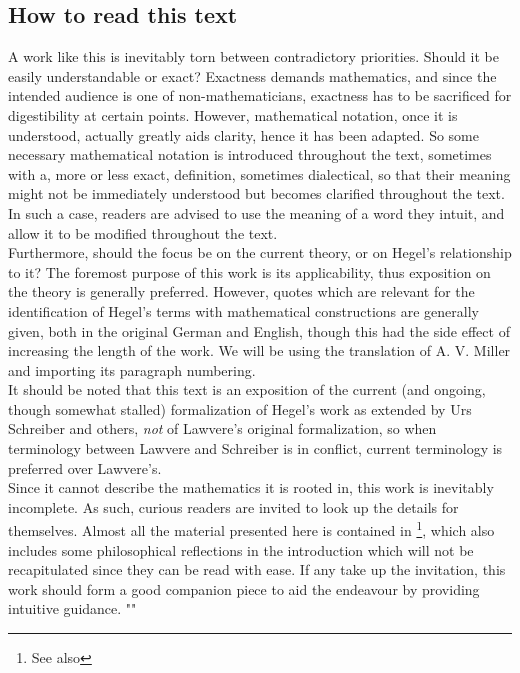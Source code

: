 \documentclass{article}
\begin{document}
\subsection{How to read this text}
A work like this is inevitably torn between contradictory priorities. Should it be easily understandable
or exact? Exactness demands mathematics, and since the intended audience is one of non-mathematicians,
exactness has to be sacrificed for digestibility at certain points. However, mathematical notation, once
it is understood, actually greatly aids clarity, hence it has been adapted. So some necessary mathematical
notation is introduced throughout the text, sometimes with a, more or less exact, definition, sometimes
dialectical, so that their meaning might not be immediately understood but becomes clarified throughout
the text. In such a case, readers are advised to use the meaning of a word they intuit, and allow it to
be modified throughout the text. \\

Furthermore, should the focus be on the current theory, or on Hegel's relationship to it? The foremost
purpose of this work is its applicability, thus exposition on the theory is generally preferred. However,
quotes which are relevant for the identification of Hegel's terms with mathematical constructions are
generally given, both in the original German and English, though this had the side effect of increasing
the length of the work. We will be using the translation of A. V. Miller and importing its paragraph numbering.
\\

It should be noted that this text is an exposition of the current (and ongoing, though somewhat stalled)
formalization of Hegel's work as extended by Urs Schreiber and others, \emph{not} of Lawvere's original
formalization, so when terminology between Lawvere and Schreiber is in conflict, current terminology is
preferred over Lawvere's. \\

Since it cannot describe the mathematics it is rooted in, this work is inevitably incomplete. As such,
 curious readers are invited to look up the details for themselves. Almost all the material presented
here is contained in \cite{nlabsol}\footnote{See also }, which also includes some philosophical reflections
in the introduction which will not be recapitulated since they can be read with ease. If any take up the
invitation, this work should form a good companion piece to aid the endeavour by providing intuitive guidance.
""
\end{document}
